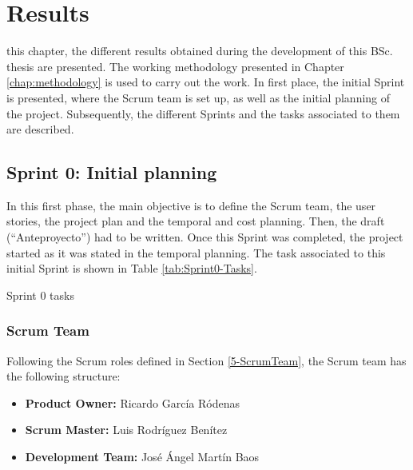 
\chapter{Results}
\label{chap:results}

 this chapter, the different results obtained during the development of this \ac{BSc.} thesis are presented. The working methodology presented in Chapter \ref{chap:methodology} is used to carry out the work. In first place, the initial Sprint is presented, where the Scrum team is set up, as well as the initial planning of the project. Subsequently, the different Sprints and the tasks associated to them are described.

\section{Sprint 0: Initial planning}
\label{Section:Sprint0}
In this first phase, the main objective is to define the Scrum team, the user stories, the project plan and the temporal and cost planning. Then, the draft (“Anteproyecto”) had to be written. Once this Sprint was completed, the project started  as it was stated in the temporal planning. The task associated to this initial Sprint is shown in Table \ref{tab:Sprint0-Tasks}.

\begin{table}[hp]
	\centering
	{\small
		
	}
	\caption{Sprint 0 tasks}
	\label{tab:Sprint0-Tasks}
\end{table}

\subsection{Scrum Team}
Following the Scrum roles defined in Section \ref{5-ScrumTeam}, the Scrum team has the following structure:
\begin{itemize}[noitemsep]
	\item \textbf{Product Owner:} Ricardo García Ródenas
	\item \textbf{Scrum Master:} Luis Rodríguez Benítez
	\item \textbf{Development Team:} José Ángel Martín Baos
\end{itemize}

